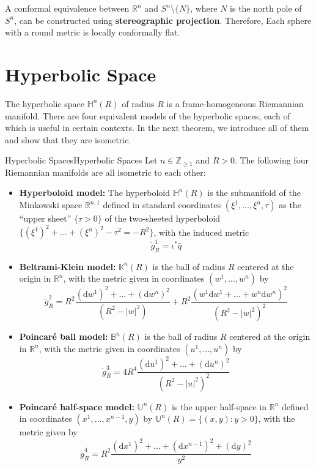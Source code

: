 \documentclass[../main.tex]{subfiles}
\begin{document}
A conformal equivalence between $\mathbb{R}^n$ and $S^n \setminus \{N\}$, where $N$ is the north pole of $S^n$, can be constructed using \textbf{stereographic projection}. Therefore, Each sphere with a round metric is locally conformally flat.

\section{Hyperbolic Space}
The hyperbolic space $\mathbb{H}^n(R)$ of radius $R$ is a frame-homogeneous Riemannian manifold. There are four equivalent models of the hyperbolic spaces, each of which is useful in certain contexts. In the next theorem, we introduce all of them and show that they are isometric.

\begin{theorem}{Hyperbolic Spaces}{Hyperbolic Spaces}
	Let $n\in \mathbb{Z}_{\geq 1}$ and $R > 0$. The following four Riemannian manifolds are all isometric to each other:
	\begin{itemize}
		\item \textbf{Hyperboloid model:} The hyperboloid $\mathbb{H}^n(R)$ is the submanifold of the Minkowski space $\mathbb{R}^{n,1}$ defined in standard coordinates $(\xi^1, \ldots , \xi^n, \tau)$ as the ``upper sheet'' $\{\tau > 0\}$ of the two-sheeted hyperboloid $\{(\xi^1)^2 + \ldots + (\xi^n)^2 - \tau^2 = -R^2\}$, with the induced metric
		      \begin{equation}
			      \breve{g}_R^1 = \iota^* \bar{q}
		      \end{equation}
		\item \textbf{Beltrami-Klein model:} $\mathbb{K}^n(R)$ is the ball of radius $R$ centered at the origin in $\mathbb{R}^n$, with the metric given in coordinates $(w^1, \ldots , w^n)$ by
		      \begin{equation}
			      \breve{g}_R^2 = R^2 \frac{(\mathrm{d} w^1)^2 + \ldots + (\mathrm{d} w^n)^2}{(R^2 - |w|^2)} + R^2 \frac{(w^1 \mathrm{d} w^1 + \ldots + w^n \mathrm{d} w^n)^2}{(R^2 - |w|^2)^2}
		      \end{equation}
		\item \textbf{Poincaré ball model:} $\mathbb{B}^n(R)$ is the ball of radius $R$ centered at the origin in $\mathbb{R}^n$, with the metric given in coordinates $(u^1, \ldots , u^n)$ by
		      \begin{equation}
			      \breve{g}_R^3 = 4 R^4 \frac{(\mathrm{d} u^1)^2 + \ldots + (\mathrm{d} u^n)^2}{(R^2 - |u|^2)^2}
		      \end{equation}
		\item \textbf{Poincaré half-space model:} $\mathbb{U}^n(R)$ is the upper half-space in $\mathbb{R}^n$ defined in coordinates $(x^1, \ldots , x^{n-1}, y)$ by $\mathbb{U}^n(R) = \{(x, y): y > 0\}$, with the metric given by
		      \begin{equation}
			      \breve{g}_R^4 = R^2 \frac{(\mathrm{d} x^1)^2 + \ldots + (\mathrm{d} x^{n-1})^2 + (\mathrm{d} y)^2}{y^2}
		      \end{equation}
	\end{itemize}
\end{theorem}
\end{document}
